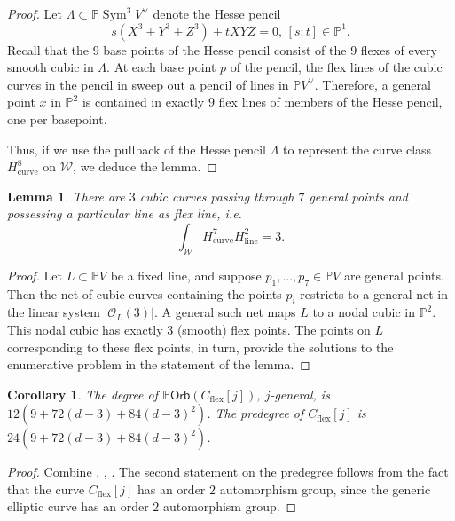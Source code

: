 \documentclass[12 pt, reqno]{amsart}
\newtheorem{cor}[thm]{Corollary}
\newtheorem{lem}[thm]{Lemma}
\theoremstyle{definition}
\newcommand{\on}{\operatorname}
\newcommand{\mb}{\mathbb}
\newcommand{\mc}{\mathcal}
\renewcommand{\P}{\mb{P}}
\newcommand{\Orb}{\mathsf{Orb}}
\begin{document}
  \begin{proof}
    Let $\Lambda \subset \P \on{Sym}^{3}V^{\vee}$ denote the Hesse
    pencil
    \[s(X^{3} + Y^3 + Z^3) + tXYZ = 0, \, [s:t] \in \P^1.\] Recall
    that the $9$ base points of the Hesse pencil consist of the $9$
    flexes of every smooth cubic in $\Lambda$.  At each base point $p$
    of the pencil, the flex lines of the cubic curves in the pencil in
    sweep out a pencil of lines in $\P V^{\vee}$.  Therefore, a
    general point $x$ in $\P^{2}$ is contained in exactly $9$ flex
    lines of members of the Hesse pencil, one per basepoint.

    Thus, if we use the pullback of the Hesse pencil $\Lambda$ to
    represent the curve class $H_{\on{curve}}^{8}$ on $\mathcal{W}$,
    we deduce the lemma.
  \end{proof}


  \begin{lem}
    \label{lem:cCflex} There are $3$ cubic curves passing through $7$
    general points and possessing a particular line as flex line,
    i.e. \[\int_{\mathcal{W}}H_{\on{curve}}^{7}H_{\on{line}}^{2}=3.\]
  \end{lem}

  \begin{proof}
    Let $L \subset \P V$ be a fixed line, and suppose
    $p_{1}, ..., p_{7} \in \P V$ are general points.  Then the net of
    cubic curves containing the points $p_{i}$ restricts to a general
    net in the linear system $|\mc{O}_{L}(3)|$.  A general such net
    maps $L$ to a nodal cubic in $\P^{2}$. This nodal cubic has
    exactly $3$ (smooth) flex points.  The points on $L$ corresponding
    to these flex points, in turn, provide the solutions to the
    enumerative problem in the statement of the lemma.
  \end{proof}

  \begin{cor}
    \label{cor:predegreeCflex}
    The degree of $\P \Orb(C_{\on{flex}}[j])$, $j$-general, is
    $12 \left(9 + 72(d-3) + 84(d-3)^2\right)$. The predegree of
    $C_{\on{flex}}[j]$ is $24 \left(9 + 72(d-3) + 84(d-3)^2\right)$.
  \end{cor}

  \begin{proof}
    Combine , ,
    . The second statement on the predegree follows
    from the fact that the curve $C_{\on{flex}}[j]$ has an order $2$
    automorphism group, since the generic elliptic curve has an order
    $2$ automorphism group.
  \end{proof}
  
\end{document}
